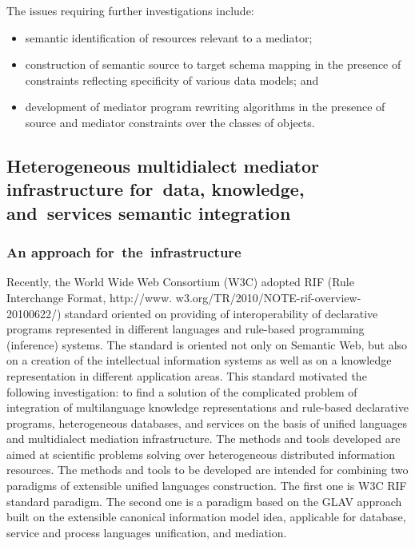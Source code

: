 \begin{multicols}{2}
The issues requiring further investigations include:
\begin{itemize}
\item semantic identification of resources relevant to a mediator;
\item construction of semantic source to target schema mapping in the presence of constraints 
reflecting specificity of various data models; and
\item development of mediator program rewriting algorithms in the presence of source and 
mediator constraints over the classes of objects.
\end{itemize}

\subsection{Heterogeneous multidialect mediator infrastructure for~data, 
knowledge, and~services semantic integration}

\subsubsection{An approach for~the~infrastructure}

\noindent
Recently, the World Wide Web Consortium (W3C) adopted RIF (Rule Interchange Format, 
{\sf http://www. w3.org/TR/2010/NOTE-rif-overview-20100622/}) standard oriented on 
providing of interoperability of declarative programs represented in different languages and 
rule-based programming (inference) systems. The standard is oriented not only on Semantic Web, but 
also on a creation of the intellectual information systems as well as on a knowledge representation 
in different application areas. This standard motivated the following investigation: to find a solution 
of the complicated problem of integration of multilanguage knowledge representations and 
rule-based declarative programs, heterogeneous databases, and services on the basis of unified 
languages and multidialect mediation infrastructure. The methods and tools developed are aimed at 
scientific problems solving over heterogeneous distributed information resources. The methods and 
tools to be developed are intended for combining two paradigms of extensible unified languages 
construction. The first one is W3C RIF standard paradigm. The second one is a 
paradigm based on the GLAV approach built on the extensible canonical information model idea, 
applicable for database, service and process languages unification, and mediation.


\end{multicols}
